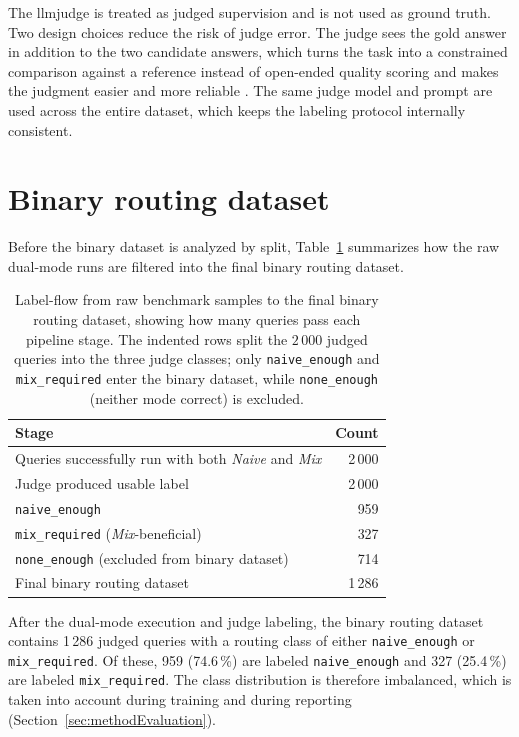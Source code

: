 \documentclass[english, bibtex]{kththesis}               %
\numberwithin{listing}{chapter}
\begin{document}
The \gls{llmjudge} is treated as judged supervision and is not used as ground truth. Two design choices reduce the risk of judge error. The judge sees the gold answer in addition to the two candidate answers, which turns the task into a constrained comparison against a reference instead of open-ended quality scoring and makes the judgment easier and more reliable \cite{zheng2023judge}. The same judge model and prompt are used across the entire dataset, which keeps the labeling protocol internally consistent.

\section{Binary routing dataset}
\label{sec:methodDataset}

Before the binary dataset is analyzed by split, Table~\ref{tab:datasetFlow} summarizes how the raw dual-mode runs are filtered into the final binary routing dataset.

\begin{table}[!ht]
\begin{center}
\caption{Label-flow from raw benchmark samples to the final binary routing dataset, showing how many queries pass each pipeline stage. The indented rows split the $2\,000$ judged queries into the three judge classes; only \texttt{naive\_enough} and \texttt{mix\_required} enter the binary dataset, while \texttt{none\_enough} (neither mode correct) is excluded.}
\label{tab:datasetFlow}
\begin{tabular}{l|r}
\textbf{Stage} & \textbf{Count} \\
\hline
Queries successfully run with both \emph{Naive} and \emph{Mix} & 2\,000 \\
Judge produced usable label & 2\,000 \\
\quad \texttt{naive\_enough} & 959 \\
\quad \texttt{mix\_required} (\emph{Mix}-beneficial) & 327 \\
\quad \texttt{none\_enough} (excluded from binary dataset) & 714 \\
Final binary routing dataset & 1\,286 \\
\end{tabular}
\end{center}
\end{table}

After the dual-mode execution and judge labeling, the binary routing dataset contains 1\,286 judged queries with a routing class of either \texttt{naive\_enough} or \texttt{mix\_required}. Of these, 959 (74.6\,\%) are labeled \texttt{naive\_enough} and 327 (25.4\,\%) are labeled \texttt{mix\_required}. The class distribution is therefore imbalanced, which is taken into account during training and during reporting (Section~\ref{sec:methodEvaluation}).
\end{document}
